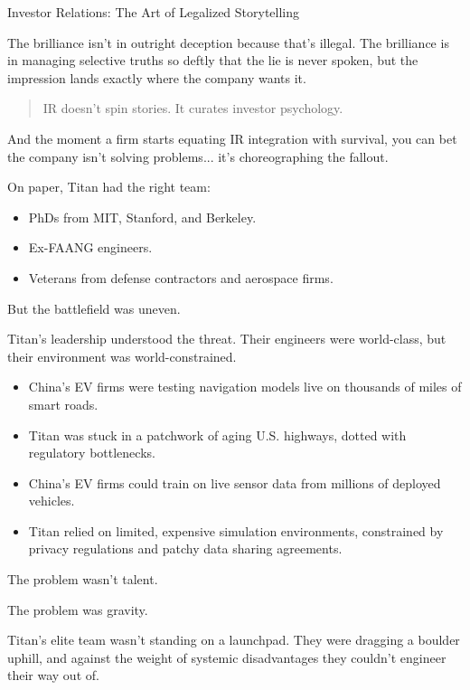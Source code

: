 \begin{HistoricalSidebar}{Investor Relations: The Art of Legalized Storytelling}
    \medskip
    
    The brilliance isn’t in outright deception because that’s illegal.  
    The brilliance is in managing selective truths so deftly that the lie is never spoken,  
    but the impression lands exactly where the company wants it.
    
    \begin{quote}
    IR doesn’t spin stories.  
    It curates investor psychology.
    \end{quote}
    
    \medskip
    
    And the moment a firm starts equating IR integration with survival,  
    you can bet the company isn’t solving problems...  it’s choreographing the fallout.
    
\end{HistoricalSidebar}

\medskip

On paper, Titan had the right team:

\begin{itemize}
    \item PhDs from MIT, Stanford, and Berkeley.
    \item Ex-FAANG engineers.
    \item Veterans from defense contractors and aerospace firms.
\end{itemize}

But the battlefield was uneven.

Titan’s leadership understood the threat.  Their engineers were world-class, but their environment was world-constrained.

\begin{itemize}
    \item China’s EV firms were testing navigation models live on thousands of miles of smart roads.
    \item Titan was stuck in a patchwork of aging U.S. highways, dotted with regulatory bottlenecks.
    \item China's EV firms could train on live sensor data from millions of deployed vehicles.
    \item Titan relied on limited, expensive simulation environments, constrained by privacy regulations and patchy data sharing agreements.
\end{itemize}

The problem wasn’t talent.

The problem was gravity.

Titan’s elite team wasn’t standing on a launchpad.
They were dragging a boulder uphill, and 
against the weight of systemic disadvantages
they couldn’t engineer their way out of.

